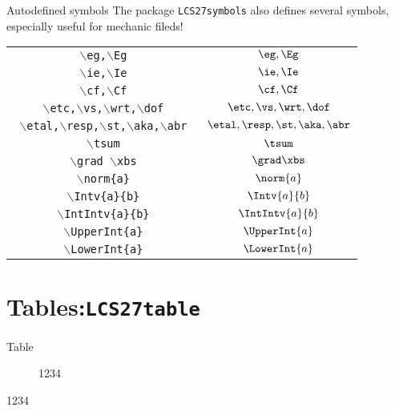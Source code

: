 \documentclass[aspectratio=169]{beamer}
\begin{document}
\begin{frame}{Autodefined symbols}
The package \texttt{LCS27symbols} also defines several symbols, especially useful for mechanic fileds!
\begin{table}[h]
\centering
\begin{tabular}{|c|c|}
\hline

\texttt{    $\backslash$eg,$\backslash$Eg   } & $     \eg,\Eg   $\\
\texttt{    $\backslash$ie,$\backslash$Ie   } & $     \ie,\Ie   $\\
\texttt{    $\backslash$cf,$\backslash$Cf   } & $     \cf,\Cf   $\\
\texttt{   $\backslash$etc,$\backslash$vs,$\backslash$wrt,$\backslash$dof    } & $     \etc,\vs,\wrt,\dof    $\\
\texttt{    $\backslash$etal,$\backslash$resp,$\backslash$st,$\backslash$aka,$\backslash$abr } & $     \etal,\resp,\st,\aka,\abr $\\
\texttt{    $\backslash$tsum } & $     \tsum $\\
\texttt{    $\backslash$grad $\backslash$xbs    } & $     \grad \xbs    $\\
\texttt{    $\backslash$norm\{a\}  } & $     \norm{a}  $\\
\texttt{$\backslash$Intv\{a\}\{b\}}&$\Intv{a}{b}$\\
\texttt{$\backslash$IntIntv\{a\}\{b\}}&$\IntIntv{a}{b}$\\
\texttt{$\backslash$UpperInt\{a\}}&$\UpperInt{a}$\\
\texttt{$\backslash$LowerInt\{a\}}&$\LowerInt{a}$\\
\hline
\end{tabular}
\end{table}
\end{frame}

\section{Tables:\texttt{LCS27table}}
\begin{frame}{Table}
\begin{figure}
\caption{1234}
\end{figure}

\begin{table}
\caption{1234}
\end{table}
\end{frame}
\end{document}
